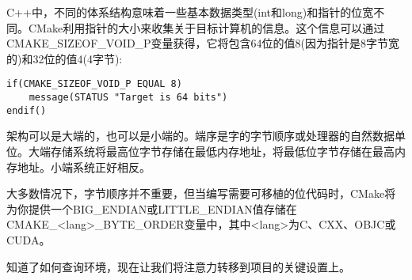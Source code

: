 C++中，不同的体系结构意味着一些基本数据类型(int和long)和指针的位宽不同。CMake利用指针的大小来收集关于目标计算机的信息。这个信息可以通过CMAKE\_SIZEOF\_VOID\_P变量获得，它将包含64位的值8(因为指针是8字节宽的)和32位的值4(4字节):

\begin{lstlisting}[style=styleCMake]
if(CMAKE_SIZEOF_VOID_P EQUAL 8)
	message(STATUS "Target is 64 bits")
endif()
\end{lstlisting}


架构可以是大端的，也可以是小端的。端序是字的字节顺序或处理器的自然数据单位。大端存储系统将最高位字节存储在最低内存地址，将最低位字节存储在最高内存地址。小端系统正好相反。

大多数情况下，字节顺序并不重要，但当编写需要可移植的位代码时，CMake将为你提供一个BIG\_ENDIAN或LITTLE\_ENDIAN值存储在CMAKE\_<lang>\_BYTE\_ORDER变量中，其中<lang>为C、CXX、OBJC或CUDA。

知道了如何查询环境，现在让我们将注意力转移到项目的关键设置上。

